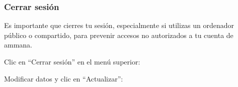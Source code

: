 \documentclass[12pt, spanish]{article}
\begin{document}
    \subsubsection{Cerrar sesión}

    \label{sec:logout}

        Es importante que cierres tu sesión, especialmente si utilizas un ordenador público
    o compartido, para prevenir accesos no autorizados a tu cuenta de ammana.

    \begin{steps}

        \item Clic en ``Cerrar sesión'' en el menú superior:

            \medskip
            \begin{minipage}[t]{\linewidth}
            \raggedright
        \end{minipage}

        \item Modificar datos y clic en ``Actualizar'':

            \medskip
            \begin{minipage}[t]{\linewidth}
            \raggedright
        \end{minipage}

    \end{steps}
\end{document}
